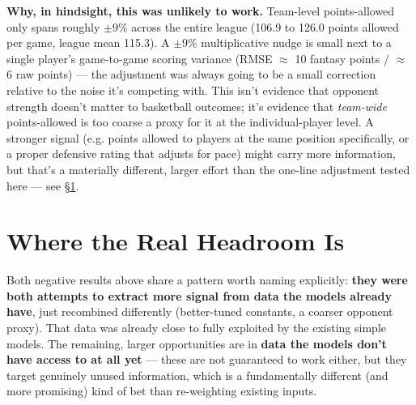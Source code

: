 \documentclass[11pt]{article}
\begin{document}
\textbf{Why, in hindsight, this was unlikely to work.} Team-level points-allowed only spans roughly $\pm 9\%$
across the entire league (106.9 to 126.0 points allowed per game, league mean 115.3). A $\pm 9\%$
multiplicative nudge is small next to a single player's game-to-game scoring variance (RMSE $\approx$ 10
fantasy points / $\approx$ 6 raw points) — the adjustment was always going to be a small correction relative
to the noise it's competing with. This isn't evidence that opponent strength doesn't matter to basketball
outcomes; it's evidence that \emph{team-wide} points-allowed is too coarse a proxy for it at the
individual-player level. A stronger signal (e.g. points allowed to players at the same position specifically,
or a proper defensive rating that adjusts for pace) might carry more information, but that's a materially
different, larger effort than the one-line adjustment tested here — see \S\ref{sec:whats-next}.

\section{Where the Real Headroom Is}
\label{sec:whats-next}

Both negative results above share a pattern worth naming explicitly: \textbf{they were both attempts to
extract more signal from data the models already have}, just recombined differently (better-tuned constants,
a coarser opponent proxy). That data was already close to fully exploited by the existing simple models. The
remaining, larger opportunities are in \textbf{data the models don't have access to at all yet} — these are
not guaranteed to work either, but they target genuinely unused information, which is a fundamentally
different (and more promising) kind of bet than re-weighting existing inputs.
\end{document}

